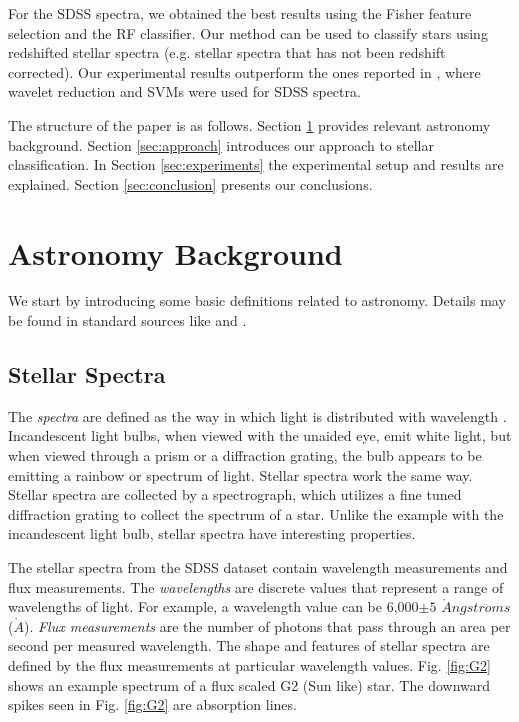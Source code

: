 \documentclass[conference]{IEEEtran}
\begin{document}
For the SDSS spectra, we obtained the best results using the Fisher feature selection and the RF classifier. Our method can be used to classify stars using redshifted stellar spectra (e.g. stellar spectra that has not been redshift corrected). Our experimental results outperform the ones reported in \cite{Xing}, where wavelet reduction and SVMs were used for SDSS spectra.

The structure of the paper is as follows. Section \ref{sec:astro} provides relevant astronomy background. Section \ref{sec:approach} introduces our approach to stellar classification. In Section \ref{sec:experiments} the experimental setup and results are explained. Section \ref{sec:conclusion} presents our conclusions.

\section{Astronomy Background}\label{sec:astro}

	We start by introducing some basic definitions related to astronomy. Details may be found in standard sources like \cite{Carroll} and \cite{Chromey}. 

	\subsection{Stellar Spectra} \label{sec:spectra}

        The \textit{spectra} are  defined as the way in which light is distributed with wavelength \cite{Chromey}. Incandescent light bulbs, when viewed with the unaided eye, emit white light, but when viewed through a prism or a diffraction grating, the bulb appears to be emitting a rainbow or spectrum of light. Stellar spectra work the same way. Stellar spectra are collected by a spectrograph, which utilizes a fine tuned diffraction grating to collect the spectrum of a star. Unlike the example with the incandescent light bulb, stellar spectra have interesting properties. 

        The stellar spectra from the SDSS dataset contain wavelength measurements and flux measurements. The \textit{wavelengths} are discrete values that represent a range of wavelengths of light. For example, a wavelength value can be 6,000$\pm5$ $\mathring{A}ngstr\ddot{o}ms$ ($\mathring{A}$). \textit{Flux measurements} are the number of photons that pass through an area per second per measured wavelength. The shape and features of stellar spectra are defined by the flux measurements at particular wavelength values. Fig. \ref{fig:G2} shows an example spectrum of a flux scaled G2 (Sun like) star. The downward spikes seen in Fig. \ref{fig:G2} are absorption lines.
\end{document}
